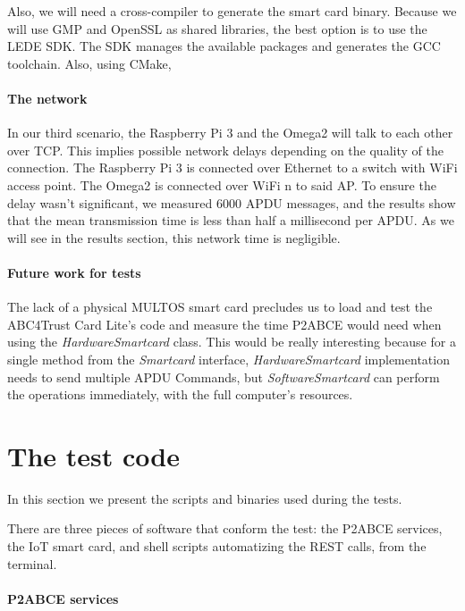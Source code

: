 Also, we will need a cross-compiler to generate the smart card binary. Because we will use GMP and OpenSSL as shared libraries, the best option is to use the LEDE SDK. The SDK manages the available packages and generates the GCC toolchain. Also, using CMake, 


\paragraph{The network} In our third scenario, the Raspberry Pi 3 and the Omega2 will talk to each other over TCP. This implies possible network delays depending on the quality of the connection. The Raspberry Pi 3 is connected over Ethernet to a switch with WiFi access point. The Omega2 is connected over WiFi n to said AP. To ensure the delay wasn't significant, we measured 6000 APDU messages, and the results show that the mean transmission time is less than half a millisecond per APDU. As we will see in the results section, this network time is negligible.

\paragraph{Future work for tests} The lack of a physical MULTOS smart card precludes us to load and test the ABC4Trust Card Lite's code and measure the time P2ABCE would need when using the \textit{HardwareSmartcard} class. This would be really interesting because for a single method from the \textit{Smartcard} interface, \textit{HardwareSmartcard} implementation needs to send multiple APDU Commands, but \textit{SoftwareSmartcard} can perform the operations immediately, with the full computer's resources.




\section{The test code}

In this section we present the scripts and binaries used during the tests.

There are three pieces of software that conform the test: the P2ABCE services, the IoT smart card, and shell scripts automatizing the REST calls, from the terminal.

\paragraph{P2ABCE services}\hfil

